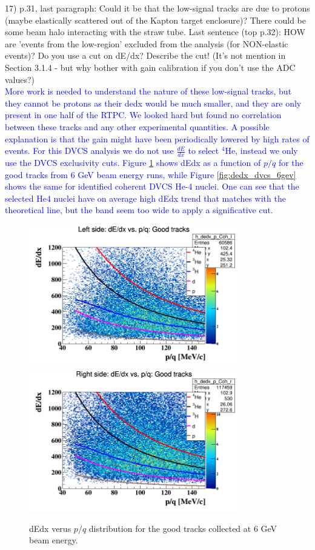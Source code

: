 17) p.31, last paragraph: Could it be that the low-signal tracks are due to 
protons (maybe elastically scattered out of the Kapton target enclosure)? There 
could be some beam halo interacting with the straw tube. Last sentence (top 
p.32): HOW are 'events from the low-region' excluded from the analysis (for 
NON-elastic events)? Do you use a cut on dE/dx? Describe the cut! (It's not 
mention in Section 3.1.4 - but why bother with gain calibration if you don't 
use the ADC values?)\\
\textcolor{blue}{More work is needed to understand the nature of these 
low-signal tracks, but they cannot be protons as their dedx would be much smaller,
and they are only present in one half of the RTPC.  We looked hard but found no
correlation between these tracks and any other experimental quantities.
A possible explanation is that the gain might have been periodically
lowered by high rates of events. For this DVCS analysis we do 
not use $\frac{dE}{dx}$ to select $^4$He, instead we only use the DVCS 
exclusivity cuts.
Figure \ref{fig:dedx_good_6gev} shows dEdx as a function of $p/q$ 
for the good tracks from 6 GeV beam energy runs, while Figure 
\ref{fig:dedx_dvcs_6gev} shows the same for identified coherent DVCS He-4 
nuclei. One can see that the selected He4 nuclei have on average high dEdx 
trend that matches with the theoretical line, 
but the band seem too wide to apply a significative cut.} \\


\begin{figure}[tbp]
\hspace{-1.0cm}
\includegraphics[height=6.2cm]{fig/dedx_p_Coh_l_good.png}
\includegraphics[height=6.2cm]{fig/dedx_p_Coh_r_good.png}
\caption{dEdx verus $p/q$ distribution for the good tracks collected at 6 GeV 
beam energy.}
\label{fig:dedx_good_6gev}
\end{figure}

